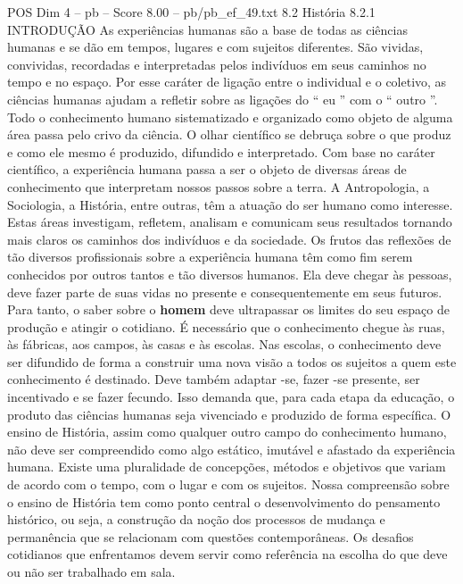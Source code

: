 \begin{textsample}{POS Dim 4 – pb – Score 8.00 – pb/pb\_ef\_49.txt}  \label{ex:f4_pos_265}
8.2 História 8.2.1 INTRODUÇÃO As experiências humanas são a base de todas as ciências humanas e se dão em tempos, lugares e com sujeitos diferentes.
São vividas, convividas, recordadas e interpretadas pelos indivíduos em seus caminhos no tempo e no espaço.
Por esse caráter de ligação entre o individual e o coletivo, as ciências humanas ajudam a refletir sobre as ligações do “ eu ” com o “ outro ”.
Todo o conhecimento humano sistematizado e organizado como objeto de alguma área passa pelo crivo da ciência.
O olhar científico se debruça sobre o que produz e como ele mesmo é produzido, difundido e interpretado.
Com base no caráter científico, a experiência humana passa a ser o objeto de diversas áreas de conhecimento que interpretam nossos passos sobre a terra.
A Antropologia, a Sociologia, a História, entre outras, têm a atuação do ser humano como interesse.
Estas áreas investigam, refletem, analisam e comunicam seus resultados tornando mais claros os caminhos dos indivíduos e da sociedade.
Os frutos das reflexões de tão diversos profissionais sobre a experiência humana têm como fim serem conhecidos por outros tantos e tão diversos humanos.
Ela deve chegar às pessoas, deve fazer parte de suas vidas no presente e consequentemente em seus futuros.
Para tanto, o saber sobre o \textbf{homem} deve ultrapassar os limites do seu espaço de produção e atingir o cotidiano.
É necessário que o conhecimento chegue às ruas, às fábricas, aos campos, às casas e às escolas.
Nas escolas, o conhecimento deve ser difundido de forma a construir uma nova visão a todos os sujeitos a quem este conhecimento é destinado.
Deve também adaptar -se, fazer -se presente, ser incentivado e se fazer fecundo.
Isso demanda que, para cada etapa da educação, o produto das ciências humanas seja vivenciado e produzido de forma específica.
O ensino de História, assim como qualquer outro campo do conhecimento humano, não deve ser compreendido como algo estático, imutável e afastado da experiência humana.
Existe uma pluralidade de concepções, métodos e objetivos que variam de acordo com o tempo, com o lugar e com os sujeitos.
Nossa compreensão sobre o ensino de História tem como ponto central o desenvolvimento do pensamento histórico, ou seja, a construção da noção dos processos de mudança e permanência que se relacionam com questões contemporâneas.
Os desafios cotidianos que enfrentamos devem servir como referência na escolha do que deve ou não ser trabalhado em sala.

\end{textsample}
